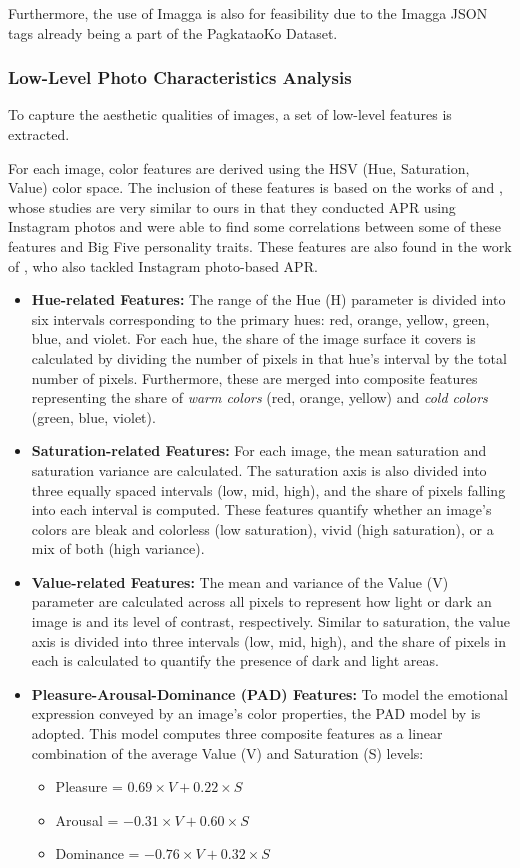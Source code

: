 Furthermore, the use of Imagga is also for feasibility due to the Imagga JSON tags already being a part of the PagkataoKo Dataset.
\subsubsection{Low-Level Photo Characteristics Analysis}
To capture the aesthetic qualities of images, a set of low-level features is extracted.

For each image, color features are derived using the HSV (Hue, Saturation, Value) color space. The inclusion of these features is based on the works of \citet{ferwerda2016} and \citet{Ferwerda2018}, whose studies are very similar to ours in that they conducted APR using Instagram photos and were able to find some correlations between some of these features and Big Five personality traits. These features are also found in the work of \citet{Branz2020}, who also tackled Instagram photo-based APR. 

\begin{itemize} \item \textbf{Hue-related Features:} The range of the Hue (H) parameter is divided into six intervals corresponding to the primary hues: red, orange, yellow, green, blue, and violet. For each hue, the share of the image surface it covers is calculated by dividing the number of pixels in that hue's interval by the total number of pixels. Furthermore, these are merged into composite features representing the share of \textit{warm colors} (red, orange, yellow) and \textit{cold colors} (green, blue, violet). \item \textbf{Saturation-related Features:} For each image, the mean saturation and saturation variance are calculated. The saturation axis is also divided into three equally spaced intervals (low, mid, high), and the share of pixels falling into each interval is computed. These features quantify whether an image's colors are bleak and colorless (low saturation), vivid (high saturation), or a mix of both (high variance). \item \textbf{Value-related Features:} The mean and variance of the Value (V) parameter are calculated across all pixels to represent how light or dark an image is and its level of contrast, respectively. Similar to saturation, the value axis is divided into three intervals (low, mid, high), and the share of pixels in each is calculated to quantify the presence of dark and light areas. \item \textbf{Pleasure-Arousal-Dominance (PAD) Features:} To model the emotional expression conveyed by an image's color properties, the PAD model by \citet{Valdez1994} is adopted. This model computes three composite features as a linear combination of the average Value (V) and Saturation (S) levels: \begin{itemize} \item Pleasure = $0.69 \times V + 0.22 \times S$ \item Arousal = $-0.31 \times V + 0.60 \times S$ \item Dominance = $-0.76 \times V + 0.32 \times S$ \end{itemize} \end{itemize} 

